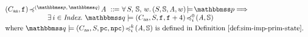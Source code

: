 \begin{definition}
    \label{def:simfunc}
    \small
    \em
    \[
        \begin{array}{l}
            \simFunction{(\asmimp, \lab{})}
                {(\relastP, \, \relastQ)}{\primcom}
            \ \define \
            \forall \, \state, \, \hpstate, \, \word. \,
            \asrtmodel{(\state, \hpstate, \primcom, \word)}{\relastP}
            \Longrightarrow \\
            \hspace*{6em}
            \exists \, i \in \Index. \
            \simFunctionSt{\relastQ}{(\asmimp, \state, \lab{}, \lab{}+4)}
                {i}{0}{(\primcom, \hpstate)} \\
            \\[-9pt]
            \text{where }
            \simFunctionSt{\relastQ}{(\asmimp, \state, \pc, \npc)}
                {i}{k}{(\primcom, \hpstate)}
            \text{ is defined in \Def{\ref{def:sim-imp-prim-state}}}.
        \end{array}
    \]
\end{definition}

